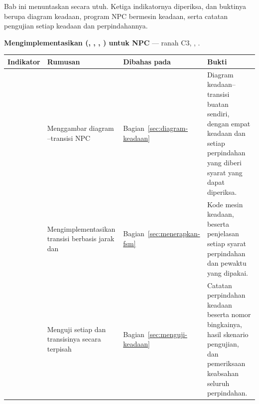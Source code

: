 \begin{subcpmkbox}
Bab ini menuntaskan  secara utuh. Ketiga indikatornya diperiksa,
dan buktinya berupa diagram keadaan, program NPC bermesin keadaan, serta
catatan pengujian setiap keadaan dan perpindahannya.

\vspace{0.5em}
\textbf{ Mengimplementasikan 
(, , , )
untuk NPC} --- ranah C3, , .

\vspace{0.5em}
{\setlength{\tabcolsep}{4pt}\footnotesize%
\begin{tabularx}{\textwidth}{@{}C{1.9cm} L{4.0cm} L{2.5cm} Y@{}}
\toprule
\headrow \textbf{Indikator} & \textbf{Rumusan} & \textbf{Dibahas pada} & \textbf{Bukti} \\
\midrule
{} & Menggambar diagram --transisi NPC &
Bagian~\ref{sec:diagram-keadaan} &
Diagram keadaan--transisi buatan sendiri, dengan empat keadaan dan setiap
perpindahan yang diberi syarat yang dapat diperiksa. \\
\addlinespace
{} & Mengimplementasikan transisi berbasis jarak dan  &
Bagian~\ref{sec:menerapkan-fsm} &
Kode mesin keadaan, beserta penjelasan setiap syarat perpindahan dan pewaktu
yang dipakai. \\
\addlinespace
{} & Menguji setiap  dan transisinya secara terpisah &
Bagian~\ref{sec:menguji-keadaan} &
Catatan perpindahan keadaan beserta nomor bingkainya, hasil skenario pengujian,
dan pemeriksaan keabsahan seluruh perpindahan. \\
\bottomrule
\end{tabularx}}
\end{subcpmkbox}
